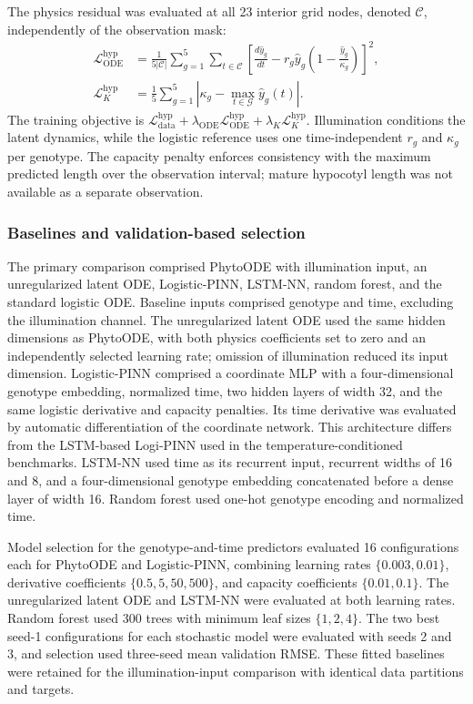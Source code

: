 The physics residual was evaluated at all 23 interior grid nodes, denoted $\mathcal C$, independently of the observation mask:
\begin{align}
 \mathcal L_{\mathrm{ODE}}^{\mathrm{hyp}}
 &=\frac{1}{5|\mathcal C|}\sum_{g=1}^{5}\sum_{t\in\mathcal C}
 \left[\frac{d\hat y_g}{dt}
 -r_g\hat y_g\left(1-\frac{\hat y_g}{\kappa_g}\right)\right]^2,
 \label{eq:hypocotyl_residual}\\
 \mathcal L_K^{\mathrm{hyp}}
 &=\frac{1}{5}\sum_{g=1}^{5}
 \left|\kappa_g-\max_{t\in\mathcal G}\hat y_g(t)\right|.
 \label{eq:hypocotyl_capacity}
\end{align}
The training objective is $\mathcal L_{\mathrm{data}}^{\mathrm{hyp}}+\lambda_{\mathrm{ODE}}\mathcal L_{\mathrm{ODE}}^{\mathrm{hyp}}+\lambda_K\mathcal L_K^{\mathrm{hyp}}$. Illumination conditions the latent dynamics, while the logistic reference uses one time-independent $r_g$ and $\kappa_g$ per genotype. The capacity penalty enforces consistency with the maximum predicted length over the observation interval; mature hypocotyl length was not available as a separate observation.

\subsubsection{Baselines and validation-based selection}

The primary comparison comprised PhytoODE with illumination input, an unregularized latent ODE, Logistic-PINN, LSTM-NN, random forest, and the standard logistic ODE. Baseline inputs comprised genotype and time, excluding the illumination channel. The unregularized latent ODE used the same hidden dimensions as PhytoODE, with both physics coefficients set to zero and an independently selected learning rate; omission of illumination reduced its input dimension. Logistic-PINN comprised a coordinate MLP with a four-dimensional genotype embedding, normalized time, two hidden layers of width 32, and the same logistic derivative and capacity penalties. Its time derivative was evaluated by automatic differentiation of the coordinate network. This architecture differs from the LSTM-based Logi-PINN used in the temperature-conditioned benchmarks. LSTM-NN used time as its recurrent input, recurrent widths of 16 and 8, and a four-dimensional genotype embedding concatenated before a dense layer of width 16. Random forest used one-hot genotype encoding and normalized time.

Model selection for the genotype-and-time predictors evaluated 16 configurations each for PhytoODE and Logistic-PINN, combining learning rates $\{0.003,0.01\}$, derivative coefficients $\{0.5,5,50,500\}$, and capacity coefficients $\{0.01,0.1\}$. The unregularized latent ODE and LSTM-NN were evaluated at both learning rates. Random forest used 300 trees with minimum leaf sizes $\{1,2,4\}$. The two best seed-1 configurations for each stochastic model were evaluated with seeds 2 and 3, and selection used three-seed mean validation RMSE. These fitted baselines were retained for the illumination-input comparison with identical data partitions and targets.

